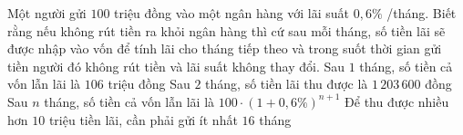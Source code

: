 \begin{ex}%
 Một người gửi $100$ triệu đồng  vào một ngân hàng với lãi suất $0{,}6\%$ /tháng. Biết rằng nếu không rút tiền ra khỏi ngân hàng thì cứ sau mỗi tháng, số tiền lãi sẽ được nhập vào vốn để tính lãi cho tháng tiếp theo và trong suốt thời gian gửi tiền người đó không rút tiền và lãi suất không thay đổi.
 \choiceTF 
  {Sau  $1$ tháng, số tiền cả vốn lẫn lãi là $106$ triệu đồng}
  {Sau $2$ tháng, số tiền lãi  thu được là $1\,203\,600$ đồng}
  {Sau $n$ tháng, số tiền cả vốn lẫn lãi là $100\cdot\left(1+0{,}6\% \right)^{n+1}$} 
  {\True Để thu được nhiều hơn $10$ triệu tiền lãi, cần phải gửi ít  nhất $16$ tháng}
\end{ex}

